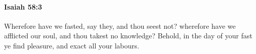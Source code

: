 
		\paragraph{Isaiah 58:3} %
			\label{ISAIAH-58-3}

			Wherefore have we fasted, say they, and thou seest not? wherefore have we afflicted our soul, and thou takest no knowledge? Behold, in the day of your fast ye find pleasure, and exact all your labours.


